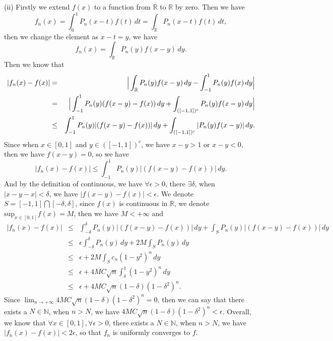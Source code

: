 \documentclass[12pt,a4paper]{ctexart}
\begin{document}
(ii) Firstly we extend $f(x)$ to a function from $\mathbb{R}$ to $\mathbb{R}$ by zero. Then we have
\begin{equation*}
    f_{n}(x) = \int_{0}^{1} P_{n}(x-t) f(t) \, d t = \int_{\mathbb{R}}^{} P_{n}(x-t) f(t) \, d t,
\end{equation*}
then we change the element as $x - t = y$, we have
\begin{equation*}
    f_{n}(x) = \int_{\mathbb{R}}^{} P_{n}(y) f(x - y) \, d y.
\end{equation*}
Then we know that
\begin{eqnarray*}
|f_{n}(x) - f(x)| &=& \Big{|}\int_{\mathbb{R}}^{} P_{n}(y) f(x - y) \, d y - \int_{-1}^{1} P_{n}(y) f(x) \, d y \Big{|}  \\
&=& \Big{|} \int_{-1}^{1} P_{n}(y) (f(x - y) - f(x)) \, d y + \int_{([-1,1])^{c}}^{} P_{n}(y) f(x-y) \, d y \Big{|} \\
&\leq& \int_{-1}^{1} P_{n}(y) | (f(x - y) - f(x))| \, d y + \int_{([-1,1])^{c}}^{} |P_{n}(y) f(x-y)| \, d y.
\end{eqnarray*}
Since when $x \in [0, 1]$ and $y \in ([-1, 1])^{c}$, we have $x - y > 1$ or $x - y < 0$, then we have $f(x -y) = 0$, so we have
\begin{equation*}
    |f_{n}(x) - f(x)| \leq \int_{-1}^{1} P_{n}(y) | (f(x - y) - f(x))| \, d y.
\end{equation*}
And by the definition of continuous, we have $\forall \epsilon > 0$, there $\exists \delta$, when $|x - y -x| < \delta$, we have $|f(x-y) - f(x)| < \epsilon$. We denote $S = [-1,1] \bigcap [-\delta, \delta]$, since $f(x)$ is continuous in $\mathbb{R}$, we denote $\text{sup}_{x \in [0, 1]} f(x) = M$, then we have $M < + \infty$ and
\begin{eqnarray*}
|f_{n}(x) - f(x)| &\leq& \int_{-\delta}^{\delta} P_{n}(y) | (f(x - y) - f(x))| \, d y  + \int_{S}^{} P_{n}(y) | (f(x - y) - f(x))| \, d y  \\
&\leq& \epsilon \int_{-\delta}^{\delta} P_{n}(y) \, d y  + 2M \int_{S}^{} P_{n}(y) \, d y   \\
&\leq& \epsilon + 2M \int_{S}^{} c_{n} (1 - y^{2})^{n} \, d y   \\
&\leq& \epsilon + 4M C \sqrt{n} \int_{\delta}^{1} (1 - y^{2})^{n} \, d y   \\
&\leq& \epsilon + 4M C \sqrt{n} (1 - \delta)(1 - \delta^{2})^{n}.
\end{eqnarray*}
Since $\lim_{n \to + \infty} 4M C \sqrt{n} (1 - \delta)(1 - \delta^{2})^{n} = 0 $, then we can say that there exists a $N \in \mathbb{N}$, when $n > N$, we have $4M C \sqrt{n} (1 - \delta)(1 - \delta^{2})^{n} < \epsilon$. Overall, we know that $\forall x \in [0, 1], \forall \epsilon > 0$, there exists a $N \in \mathbb{N}$, when $n > N$, we have $|f_{n}(x) - f(x)| < 2 \epsilon$, so that $f_{n}$ is uniformly converges to $f$.
\end{document}
